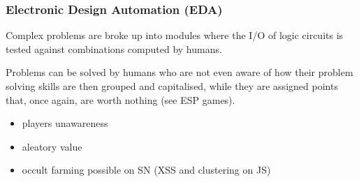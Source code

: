 \documentclass{beamer}
\begin{document}
\begin{frame}
\frametitle{Electronic  Design  Automation  (EDA)}
\label{sec-3_4}



Complex problems are broke up into modules where the I/O of logic
circuits is tested against combinations computed by humans.

Problems can be solved by humans who are not even aware of how their
problem solving skills are then grouped and capitalised, while they
are assigned points that, once again, are worth nothing (see ESP
games).

\begin{itemize}
\item players unawareness
\item aleatory value
\item occult farming possible on SN (XSS and clustering on JS)
\end{itemize}
\end{frame}
\end{document}
